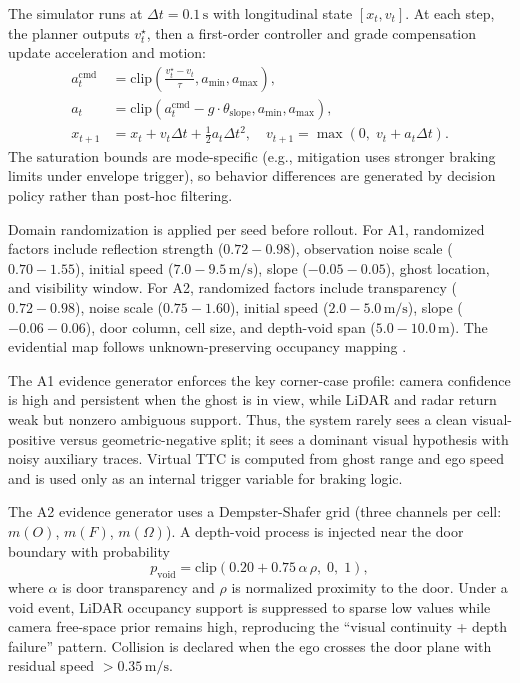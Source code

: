 \documentclass[sigconf,nonacm]{acmart}
\begin{document}
The simulator runs at $\Delta t=0.1\,\mathrm{s}$ with longitudinal state $[x_t,v_t]$. At each step, the planner outputs $v_t^\star$, then a first-order controller and grade compensation update acceleration and motion:
\begin{equation}
\begin{aligned}
a_t^{\mathrm{cmd}} &= \mathrm{clip}\!\left(\frac{v_t^\star-v_t}{\tau}, a_{\min}, a_{\max}\right),\\
a_t &= \mathrm{clip}\!\left(a_t^{\mathrm{cmd}}-g\cdot \theta_{\mathrm{slope}}, a_{\min}, a_{\max}\right),\\
x_{t+1} &= x_t + v_t\Delta t + \tfrac{1}{2}a_t\Delta t^2,\quad
v_{t+1} = \max(0,\;v_t+a_t\Delta t).
\end{aligned}
\label{eq:sim_dyn}
\end{equation}
The saturation bounds are mode-specific (e.g., mitigation uses stronger braking limits under envelope trigger), so behavior differences are generated by decision policy rather than post-hoc filtering.

Domain randomization is applied per seed before rollout. For A1, randomized factors include reflection strength ($0.72\!-\!0.98$), observation noise scale ($0.70\!-\!1.55$), initial speed ($7.0\!-\!9.5\,\mathrm{m/s}$), slope ($-0.05\!-\!0.05$), ghost location, and visibility window. For A2, randomized factors include transparency ($0.72\!-\!0.98$), noise scale ($0.75\!-\!1.60$), initial speed ($2.0\!-\!5.0\,\mathrm{m/s}$), slope ($-0.06\!-\!0.06$), door column, cell size, and depth-void span ($5.0\!-\!10.0\,\mathrm{m}$). The evidential map follows unknown-preserving occupancy mapping \cite{elfes2013,ufomap2020}.

The A1 evidence generator enforces the key corner-case profile: camera confidence is high and persistent when the ghost is in view, while LiDAR and radar return weak but nonzero ambiguous support. Thus, the system rarely sees a clean visual-positive versus geometric-negative split; it sees a dominant visual hypothesis with noisy auxiliary traces. Virtual TTC is computed from ghost range and ego speed and is used only as an internal trigger variable for braking logic.

The A2 evidence generator uses a Dempster-Shafer grid (three channels per cell: $m(O)$, $m(F)$, $m(\Omega)$). A depth-void process is injected near the door boundary with probability
\begin{equation}
p_{\mathrm{void}}=\mathrm{clip}\!\left(0.20 + 0.75\,\alpha\,\rho,\;0,\;1\right),
\label{eq:pvoid}
\end{equation}
where $\alpha$ is door transparency and $\rho$ is normalized proximity to the door. Under a void event, LiDAR occupancy support is suppressed to sparse low values while camera free-space prior remains high, reproducing the ``visual continuity + depth failure'' pattern. Collision is declared when the ego crosses the door plane with residual speed $>0.35\,\mathrm{m/s}$.
\end{document}
